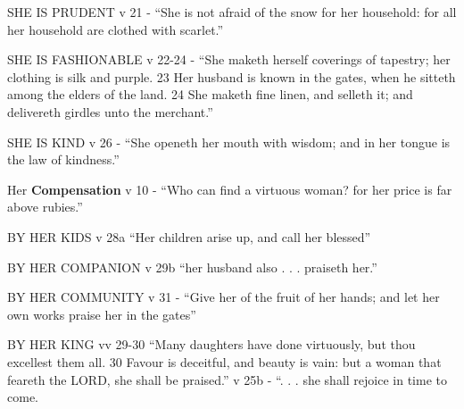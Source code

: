 \begin{compactenum}[I.]
\begin{compactenum}[A.]
    	\item SHE IS PRUDENT  v 21 - “She is not afraid of the snow for her household: for all her household are clothed with scarlet.”
    	\item SHE IS FASHIONABLE  v 22-24 - “She maketh herself coverings of tapestry; her clothing is silk and purple. {23} Her husband is known in the gates, when he sitteth among the elders of the land. {24} She maketh fine linen, and selleth it; and delivereth girdles unto the merchant.”
    	\item SHE IS KIND  v 26 - “She openeth her mouth with wisdom; and in her tongue is the law of kindness.”
    \end{compactenum}
   \item Her \textbf{Compensation}  v 10 - “Who can find a virtuous woman? for her price is far above rubies.”
   \begin{compactenum}[A.]
    	\item BY HER KIDS
 v 28a “Her children arise up, and call her blessed”
    	\item BY HER COMPANION
 v 29b “her husband also . . . praiseth her.”
    	\item  BY HER COMMUNITY
 v 31 - “Give her of the fruit of her hands; and let her own works praise her in the gates”
    	\item BY HER KING
 vv 29-30 “Many daughters have done virtuously, but thou excellest them all. {30} Favour is deceitful, and beauty is vain: but a woman that feareth the LORD, she shall be praised.”
 v 25b - “. . . she shall rejoice in time to come.
    \end{compactenum}

\end{compactenum}

